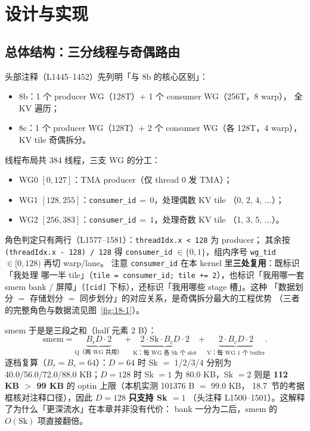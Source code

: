 \section{设计与实现}

\subsection{总体结构：三分线程与奇偶路由}

头部注释（L1445--1452）先列明「与 8b 的核心区别」：

\begin{itemize}
  \item 8b：1 个 producer WG（128T）$+$ 1 个 consumer WG（256T，8 warp），
        全 KV 遍历；
  \item 8c：1 个 producer WG（128T）$+$ 2 个 consumer WG（各 128T，4 warp），
        KV tile 奇偶拆分。
\end{itemize}

线程布局共 384 线程，三支 WG 的分工：

\begin{itemize}
  \item WG0 $[0,127]$：TMA producer（仅 thread 0 发 TMA）；
  \item WG1 $[128,255]$：\texttt{consumer\_id}$\,{=}\,0$，处理偶数 KV tile
        （0, 2, 4, $\dots$）；
  \item WG2 $[256,383]$：\texttt{consumer\_id}$\,{=}\,1$，处理奇数 KV tile
        （1, 3, 5, $\dots$）。
\end{itemize}

角色判定只有两行（L1577--1581）：\texttt{threadIdx.x < 128} 为 producer；
其余按 \texttt{\allowbreak{}(thread\allowbreak{}Idx.\allowbreak{}x - 128) /\allowbreak{} 128} 得 \texttt{consumer\_id}
$\in \{0, 1\}$，组内序号 \texttt{wg\_tid} $\in [0, 128)$ 再切 warp/lane。
注意 \texttt{consumer\_id} 在本 kernel 里\textbf{三处复用}：既标识「我处理
哪一半 tile」（\texttt{tile =\allowbreak{} consumer\_\allowbreak{}id; tile +=\allowbreak{} 2}），也标识「我用哪一套
smem bank / 屏障」（\texttt{[cid]} 下标），还标识「我用哪些 stage 槽」。这种
「数据划分 $=$ 存储划分 $=$ 同步划分」的对应关系，是奇偶拆分最大的工程优势
（三者的完整角色与数据流见图~\ref{fig:18-1}）。



smem 于是是三段之和（half 元素 2 B）：
\begin{equation}
  \mathrm{smem} = \underbrace{B_r D \cdot 2}_{\text{Q（两 WG 共用）}}
  + \underbrace{2 \cdot \mathrm{Sk} \cdot B_c D \cdot 2}_{\text{K：每 WG 各 Sk 个 slot}}
  + \underbrace{2 \cdot B_c D \cdot 2}_{\text{V：每 WG 1 个 buffer}} .
  \label{eq:18-smem}
\end{equation}
逐档复算（$B_r = B_c = 64$）：$D{=}64$ 时 Sk $=$ 1/2/3/4 分别为
40.0/56.0/72.0/88.0 KB；$D{=}128$ 时 Sk $=1$ 为 80.0 KB，Sk $=2$ 则是
\textbf{112 KB $>$ 99 KB} 的 optin 上限（本机实测 101376 B $=$ 99.0 KB，
18.7~节的考据框核对注释口径），因此 $D{=}128$ \textbf{只支持 Sk $= 1$}
（头注释 L1500--1501）。这解释了为什么「更深流水」在本章并非没有代价：
bank 一分为二后，smem 的 $O(\mathrm{Sk})$ 项直接翻倍。

